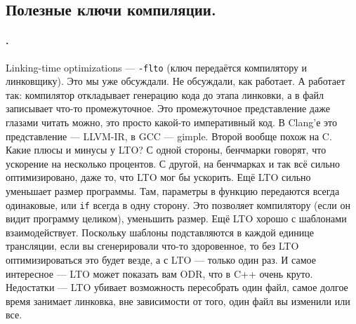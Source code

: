 \documentclass{article}
\begin{document}
    \subsection{Полезные ключи компиляции.}
    \paragraph{.}
    Linking-time optimizations --- \texttt{-flto} (ключ передаётся компилятору и линковщику). Это мы уже обсуждали. Не обсуждали, как работает. А работает так: компилятор откладывает генерацию кода до этапа линковки, а в файл записывает что-то промежуточное. Это промежуточное представление даже глазами читать можно, это просто какой-то императивный код. В Clang'е это представление --- LLVM-IR, в GCC --- gimple. Второй вообще похож на C. Какие плюсы и минусы у LTO? С одной стороны, бенчмарки говорят, что ускорение на несколько процентов. С другой, на бенчмарках и так всё сильно оптимизировано, даже то, что LTO мог бы ускорить. Ещё LTO сильно уменьшает размер программы. Там, параметры в функцию передаются всегда одинаковые, или \texttt{if} всегда в одну сторону. Это позволяет компилятору (если он видит программу целиком), уменьшить размер. Ещё LTO хорошо с шаблонами взаимодействует. Поскольку шаблоны подставляются в каждой единице трансляции, если вы сгенерировали что-то здоровенное, то без LTO оптимизироваться это будет везде, а с LTO --- только один раз. И самое интересное --- LTO может показать вам ODR, что в C++ очень круто. Недостатки --- LTO убивает возможность пересобрать один файл, самое долгое время занимает линковка, вне зависимости от того, один файл вы изменили или все.
\end{document}
